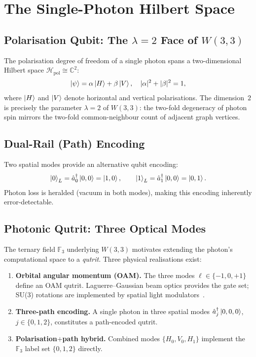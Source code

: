 ﻿\documentclass[12pt]{article}
\newcommand{\GF}[1]{\mathbb{F}_{#1}}
\begin{document}
\section{The Single-Photon Hilbert Space}
\label{sec:hilbert}

\subsection{Polarisation Qubit: The \texorpdfstring{$\lambda=2$}{lambda=2} Face of \texorpdfstring{$W(3,3)$}{W(3,3)}}

The polarisation degree of freedom of a single photon spans a two-dimensional Hilbert
space $\mathcal{H}_{\mathrm{pol}} \cong \mathbb{C}^2$:
\begin{equation}
  \ket{\psi} = \alpha\ket{H} + \beta\ket{V}, \quad |\alpha|^2+|\beta|^2 = 1,
\end{equation}
where $\ket{H}$ and $\ket{V}$ denote horizontal and vertical polarisations.  The
dimension~$2$ is precisely the parameter $\lambda = 2$ of $W(3,3)$: the two-fold
degeneracy of photon spin mirrors the two-fold common-neighbour count of adjacent
graph vertices.

\subsection{Dual-Rail (Path) Encoding}

Two spatial modes provide an alternative qubit encoding:
\begin{equation}
  \ket{0}_L = \hat{a}_0^\dagger\ket{0,0} = \ket{1,0}, \qquad
  \ket{1}_L = \hat{a}_1^\dagger\ket{0,0} = \ket{0,1}.
\end{equation}
Photon loss is heralded (vacuum in both modes), making this encoding inherently
error-detectable.

\subsection{Photonic Qutrit: Three Optical Modes}

The ternary field $\GF{3}$ underlying $W(3,3)$ motivates extending the photon's
computational space to a \emph{qutrit}.  Three physical realisations exist:

\begin{enumerate}[label=(\alph*)]
  \item \textbf{Orbital angular momentum (OAM).}  The three modes
    $\ell \in \{-1, 0, +1\}$ define an OAM qutrit.
    Laguerre--Gaussian beam optics provides the gate set; SU(3) rotations are
    implemented by spatial light modulators~\cite{Erhard2018}.
  \item \textbf{Three-path encoding.}  A single photon in three spatial modes
    $\hat{a}_j^\dagger\ket{0,0,0}$, $j\in\{0,1,2\}$, constitutes a path-encoded
    qutrit.
  \item \textbf{Polarisation$+$path hybrid.}  Combined modes
    $\{H_0, V_0, H_1\}$ implement the $\GF{3}$ label set $\{0,1,2\}$ directly.
\end{enumerate}
\end{document}
